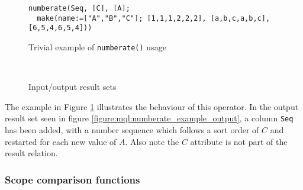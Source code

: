 \begin{figure}[!h]
\begin{center}
\begin{Verbatim}
numberate(Seq, [C], [A];
  make(name:=["A","B","C"]; [1,1,1,2,2,2], [a,b,c,a,b,c],[6,5,4,6,5,4]))
\end{Verbatim}
  \caption{Trivial example of \texttt{numberate()} usage}
  \label{figure:mql:numberate_example}
\end{center}
\end{figure}

\begin{figure}[!h]
\centering
\mbox{
\quad
{}
}
\caption{Input/output result sets}
\end{figure}
The example in Figure \ref{figure:mql:numberate_example} illustrates the
behaviour of this operator. In the output result set seen in figure
\ref{figure:mql:numberate_example_output}, a column \texttt{Seq} has been
added, with a number sequence which follows a sort order of $C$ and restarted for each new value of $A$.
Also note the $C$ attribute is not part of the result relation.

\subsubsection{Scope comparison functions}

